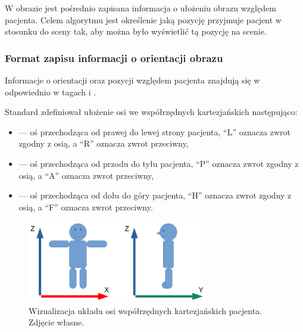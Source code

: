 \label{sec:algorithm-imageorientationindicator}

W obrazie \DICOM jest pośrednio zapisana informacja o ułożeniu obrazu względem pacjenta.
Celem algorytmu jest określenie jaką pozycję przyjmuje pacjent w stosunku do sceny tak, aby można było wyświetlić tą pozycję na scenie.

\subsubsection{Format zapisu informacji o orientacji obrazu}

\par
Informacje o orientacji oraz pozycji względem pacjenta znajdują się w odpowiednio w tagach  i .

\par
Standard \DICOM zdefiniował ułożenie osi we współrzędnych kartezjańskich następująco:
\begin{itemize}
    \item {} --- oś przechodząca od prawej do lewej strony pacjenta, \enquote{L} oznacza zwrot zgodny z osią, a \enquote{R} oznacza zwrot przeciwny,

    \item {} --- oś przechodząca od przodu do tyłu pacjenta, \enquote{P} oznacza zwrot zgodny z osią, a \enquote{A} oznacza zwrot przeciwny,

    \item {} --- oś przechodząca od dołu do góry pacjenta, \enquote{H} oznacza zwrot zgodny z osią, a \enquote{F} oznacza zwrot przeciwny.

\end{itemize}

\begin{figure}[!htbp]
    \centering
    \includegraphics[width=0.7\textwidth]{img/imageorientationindicator-003.pdf}
    \caption{Wizualizacja układu osi współrzędnych kartezjańskich pacjenta. Zdjęcie własne.}
    \label{fig:imageorientationindicator2}
\end{figure}


